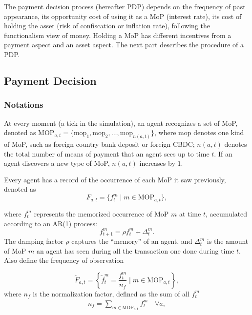 The payment decision process (hereafter PDP) depends on the frequency of past
appearance, its opportunity cost of using it as a MoP (interest rate), its cost
of holding the asset (risk of confiscation or inflation rate), following the
functionalism view of money. Holding a MoP has different incentives from a
payment aspect and an asset aspect. The next part describes the procedure of a PDP\@.

\subsection{Payment Decision}

\newcommand{\MOP}{\mathrm{MOP}}
\newcommand{\mop}{\mathrm{mop}}

\subsubsection*{Notations}

At every moment (a tick in the simulation), an agent recognizes a set of MoP,
denoted as $\MOP_{a,t} = \{ \mop_1, \mop_2, \dots, \mop_{n(a,t)} \}$, where
$\mop$ denotes one kind of MoP, such as foreign country bank deposit or foreign
CBDC\@; $n(a,t)$ denotes the total number of means of payment that an agent sees
up to time $t$. If an agent discovers a new type of MoP, $n(a,t)$ increases by $1$.

Every agent has a record of the occurrence of each MoP it saw previously, denoted as
\begin{equation}
   F_{a,t} = \{f^m_t \mid m \in \MOP_{a,t}\} ,
\end{equation}

where $f^m_t$ represents the memorized occurrence of MoP $m$ at time $t$, accumulated according to an AR(1) process:
\begin{equation}
   f^m_{t+1} = \rho f^m_t + \Delta^m_t .
\end{equation}
The damping factor $\rho$ captures the ``memory'' of an agent, and $\Delta^m_t$
is the amount of MoP $m$ an agent has seen during all the transaction one done
during time $t$.
Also define the frequency of observation

\begin{equation}
   \tilde{F}_{a,t} = \left\{ \tilde{f}^m_t = \frac{f^m_t}{n_f} \mid  m \in \MOP_{a,t}\right\},
\end{equation}
where $n_f$ is the normalization factor, defined as the sum of all $f^m_t$
\begin{eqnarray*}
   n_{f} = \sum_{m \in \MOP_{a,t}} f^m_t \quad \forall a ,
\end{eqnarray*}

